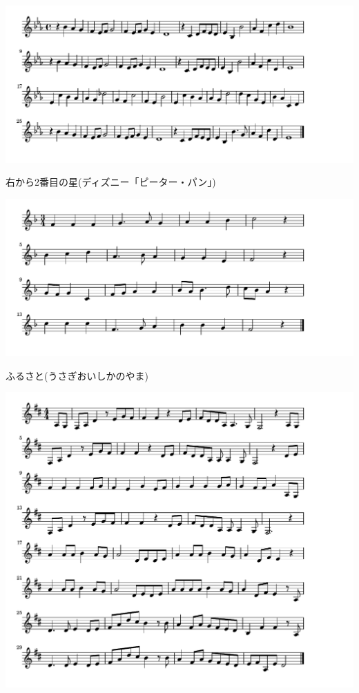 \documentclass[a4paper]{ltjsarticle}
\begin{document}
\includegraphics[clip]{migikara2banme_crop.pdf}

\vspace{-10mm} \hspace{10mm}
右から2番目の星(ディズニー「ピーター・パン」)

\includegraphics[clip]{furusato_crop.pdf}

\vspace{-10mm} \hspace{10mm}
ふるさと(うさぎおいしかのやま)

\includegraphics[clip]{hanawasaku_crop.pdf}
\end{document}

